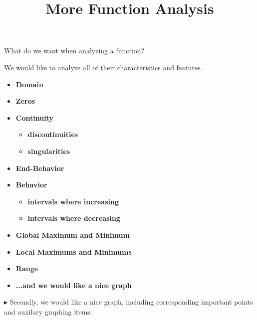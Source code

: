 \documentclass{ximera}
\title{More Function Analysis}
\begin{document}
\begin{abstract}
%
\end{abstract}
\maketitle






What do we want when analyzing a function?



We would like to analyze all of their characteristics and features. \\



\begin{itemize}
\item \textbf{\textcolor{red!80!black}{Domain}} 
\item \textbf{\textcolor{red!80!black}{Zeros}} 
\item \textbf{\textcolor{red!80!black}{Continuity}} 
  \begin{itemize}
     \item \textbf{\textcolor{purple!85!blue}{discontinuities}} 
     \item \textbf{\textcolor{purple!85!blue}{singularities}} 
  \end{itemize}
\item \textbf{\textcolor{red!80!black}{End-Behavior}} 
\item \textbf{\textcolor{red!80!black}{Behavior}} 
  \begin{itemize}
     \item \textbf{\textcolor{purple!85!blue}{intervals where increasing}} 
     \item \textbf{\textcolor{purple!85!blue}{intervals where decreasing}} 
  \end{itemize}
\item \textbf{\textcolor{red!80!black}{Global Maximum and Minimum}} 
\item \textbf{\textcolor{red!80!black}{Local Maximums and Minimums}} 
\item \textbf{\textcolor{red!80!black}{Range}} 
\item \textbf{\textcolor{blue!55!black}{...and we would like a nice graph}} 
\end{itemize}




$\blacktriangleright$ Secondly, we would like a nice graph, including corresponding important points and auxilary graphing items.
\end{document}

